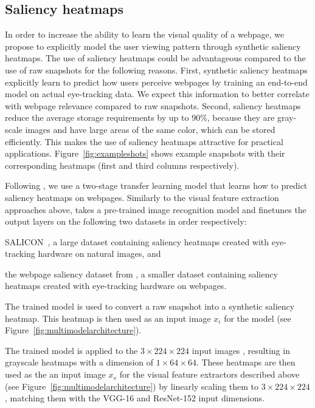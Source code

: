 \subsection{Saliency heatmaps} \label{sec:saliency}
In order to increase the ability to learn the visual quality of a webpage, we propose to explicitly model the user viewing pattern through synthetic saliency heatmaps.
The use of saliency heatmaps could be advantageous compared to the use of raw snapshots for the following reasons.
First, synthetic saliency heatmaps explicitly learn to predict how users perceive webpages by training an end-to-end model on actual eye-tracking data.
We expect this information to better correlate with webpage relevance compared to raw snapshots.
Second, saliency heatmaps reduce the average storage requirements by up to 90\%,
because they are gray-scale images and have large areas of the same color, which can be stored efficiently.
This makes the use of saliency heatmaps attractive for practical applications.
Figure~\ref{fig:exampleshots} shows example snapshots with their corresponding heatmaps (first and third columns respectively).

Following \cite{shan2017two}, we use a two-stage transfer learning model that learns how to predict saliency heatmaps on webpages.
Similarly to the visual feature extraction approaches above, \cite{shan2017two} takes a pre-trained image recognition model and finetunes the output layers on the following two datasets in order respectively:
\begin{inparaenum}[(i)]
\item SALICON~\cite{jiang2015salicon}, a large dataset containing saliency heatmaps created with eye-tracking hardware on natural images, and 
\item the webpage saliency dataset from \cite{shen2014webpage}, a smaller dataset containing saliency heatmaps created with eye-tracking hardware on webpages.
\end{inparaenum}

The trained model is used to convert a raw snapshot into a synthetic saliency heatmap. This heatmap is then used as an input image $x_i$ for the \modelname{} model (see Figure~\ref{fig:multimodelarchitecture}).
%

The trained model is applied to the $3\times224\times224$ input images , resulting in grayscale heatmaps with a dimension of $1\times64\times64$.
These heatmaps are then used as the an input image $x_{v}$ for the visual feature extractors described above (see Figure~\ref{fig:multimodelarchitecture}) by linearly scaling them to $3\times224\times224$, matching them with the VGG-16 and ResNet-152 input dimensions.
\fi